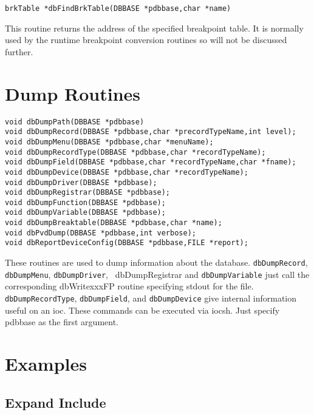 \begin{verbatim}brkTable *dbFindBrkTable(DBBASE *pdbbase,char *name)
\end{verbatim}This routine returns the address of the specified breakpoint table. It is normally used by the runtime breakpoint conversion 
routines so will not be discussed further.

\section{Dump Routines}

\begin{verbatim}void dbDumpPath(DBBASE *pdbbase)
void dbDumpRecord(DBBASE *pdbbase,char *precordTypeName,int level);
void dbDumpMenu(DBBASE *pdbbase,char *menuName);
void dbDumpRecordType(DBBASE *pdbbase,char *recordTypeName);
void dbDumpField(DBBASE *pdbbase,char *recordTypeName,char *fname);
void dbDumpDevice(DBBASE *pdbbase,char *recordTypeName);
void dbDumpDriver(DBBASE *pdbbase);
void dbDumpRegistrar(DBBASE *pdbbase);
void dbDumpFunction(DBBASE *pdbbase);
void dbDumpVariable(DBBASE *pdbbase);
void dbDumpBreaktable(DBBASE *pdbbase,char *name);
void dbPvdDump(DBBASE *pdbbase,int verbose);
void dbReportDeviceConfig(DBBASE *pdbbase,FILE *report);
\end{verbatim}
These routines are used to dump information about the database. \verb|dbDumpRecord|, \verb|dbDumpMenu|, \verb|dbDumpDriver|,\verb| |
dbDumpRegistrar and \verb|dbDumpVariable| just call the corresponding dbWritexxxFP routine specifying stdout for 
the file. \verb|dbDumpRecordType|, \verb|dbDumpField|, and \verb|dbDumpDevice| give internal information useful on an ioc. 
These commands can be executed via iocsh. Just specify pdbbase as the first argument.

\section{Examples}

\subsection{Expand Include}


